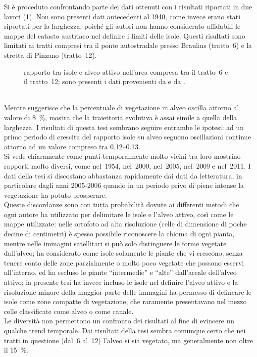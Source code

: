 Si è proceduto confrontando parte dei dati ottenuti con i risultati riportati in due lavori  (\cref{graph:rapp-isl-vs-letteratura}).
Non sono presenti dati antecedenti al 1940, come invece erano stati riportati per la larghezza, poiché gli autori non hanno considerato affidabili le mappe del catasto austriaco nel definire i limiti delle isole.
Questi risultati sono limitati ai tratti compresi tra il ponte autostradale presso Braulins (tratto~6) e la stretta di Pinzano (tratto~12).
%
\begin{figure}
	\centering
	
	\caption[rapporto tra isole e alveo attivo nell'area compresa tra il tratto~6 e il tratto~12]{rapporto tra isole e alveo attivo nell'area compresa tra il tratto~6 e il tratto~12; sono presenti i dati provenienti da  e da .}
	\label{graph:rapp-isl-vs-letteratura}
\end{figure}
%
\\
Mentre  suggerisce che la percentuale di vegetazione in alveo oscilla attorno al valore di \SI{8}{\percent},  mostra che la traiettoria evolutiva è assai simile a quella della larghezza.
I risultati di questa tesi sembrano seguire entrambe le ipotesi: ad un primo periodo di crescita del rapporto isole su alveo seguono oscillazioni continue attorno ad un valore compreso tra \numrange[range-phrase={ e }]{0.12}{0.13}.
\\
Si vede chiaramente come punti temporalmente molto vicini tra loro mostrino rapporti molto diversi, come nel~1954, nel~2000, nel~2005, nel~2009 e nel~2011.
I dati della tesi si discostano abbastanza rapidamente dai dati da letteratura, in particolare dagli anni 2005-2006 quando in un periodo privo di piene intense la vegetazione ha potuto prosperare.
\\
Queste discordanze sono con tutta probabilità dovute ai differenti metodi che ogni autore ha utilizzato per delimitare le isole e l'alveo attivo, così come le mappe utilizzate:
nelle ortofoto ad alta risoluzione (celle di dimensione di poche decine di centimetri) è spesso possibile riconoscere la chioma di ogni pianta, mentre nelle immagini satellitari si può solo distinguere le forme vegetate dall'alveo;
 ha considerato come isole solamente le piante che vi crescono, senza tenere conto delle zone parzialmente o molto poco vegetate che possono esservi all'interno, ed ha escluso le piante “intermedie” e “alte” dall'areale dell'alveo attivo;
la presente tesi ha invece incluso le isole nel definire l'alveo attivo e la risoluzione minore della maggior parte delle immagini ha permesso di delineare le isole come zone compatte di vegetazione, che raramente presentavano nel mezzo celle classificate come alveo o come canale.
\\
Le diversità non permettono un confronto dei risultati al fine di evincere un qualche trend temporale.
Dai risultati della tesi sembra comunque certo che nei tratti in questione (dal~6 al~12) l'alveo si sia vegetato, ma generalmente non oltre il \SI{15}{\percent}.



